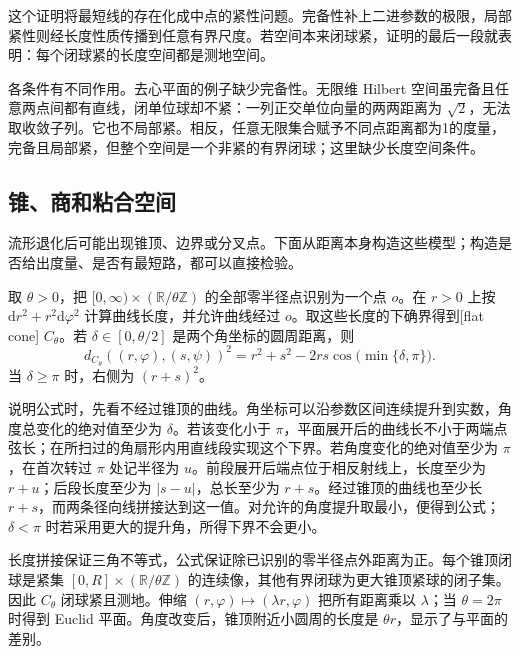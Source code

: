 这个证明将最短线的存在化成中点的紧性问题。完备性补上二进参数的极限，局部紧性则经长度性质传播到任意有界尺度。若空间本来闭球紧，证明的最后一段就表明：每个闭球紧的长度空间都是测地空间。

\ProseParagraphBreak

各条件有不同作用。去心平面的例子缺少完备性。无限维 Hilbert 空间虽完备且任意两点间都有直线，闭单位球却不紧：一列正交单位向量的两两距离为 \(\sqrt2\)，无法取收敛子列。它也不局部紧。相反，任意无限集合赋予不同点距离都为1的度量，完备且局部紧，但整个空间是一个非紧的有界闭球；这里缺少长度空间条件。

\subsection{锥、商和粘合空间}
\label{g3:subsec:1001:03}
流形退化后可能出现锥顶、边界或分叉点。下面从距离本身构造这些模型；构造是否给出度量、是否有最短路，都可以直接检验。

\begin{example}\label{g3:exm:flat-metric-cone}
	取 \(\theta>0\)，把 \([0,\infty)\times(\mathbb R/\theta\mathbb Z)\) 的全部零半径点识别为一个点 \(o\)。在 \(r>0\) 上按
	\(\mathrm dr^2+r^2\mathrm d\varphi^2\)
	计算曲线长度，并允许曲线经过 \(o\)。取这些长度的下确界得到[flat cone] \(C_\theta\)。若 \(\delta\in[0,\theta/2]\) 是两个角坐标的圆周距离，则
	\begin{equation}\label{g3:eq:flat-cone-distance}
		d_{C_\theta}((r,\varphi),(s,\psi))^2
		=r^2+s^2-2rs\cos\bigl(\min\{\delta,\pi\}\bigr).
	\end{equation}
	当 \(\delta\ge\pi\) 时，右侧为 \((r+s)^2\)。

	说明公式时，先看不经过锥顶的曲线。角坐标可以沿参数区间连续提升到实数，角度总变化的绝对值至少为 \(\delta\)。若该变化小于 \(\pi\)，平面展开后的曲线长不小于两端点弦长；在所扫过的角扇形内用直线段实现这个下界。若角度变化的绝对值至少为 \(\pi\)，在首次转过 \(\pi\) 处记半径为 \(u\)。前段展开后端点位于相反射线上，长度至少为 \(r+u\)；后段长度至少为 \(|s-u|\)，总长至少为 \(r+s\)。经过锥顶的曲线也至少长 \(r+s\)，而两条径向线拼接达到这一值。对允许的角度提升取最小，便得到公式；\(\delta<\pi\) 时若采用更大的提升角，所得下界不会更小。

	长度拼接保证三角不等式，公式保证除已识别的零半径点外距离为正。每个锥顶闭球是紧集 \([0,R]\times(\mathbb R/\theta\mathbb Z)\) 的连续像，其他有界闭球为更大锥顶紧球的闭子集。因此 \(C_\theta\) 闭球紧且测地。伸缩 \((r,\varphi)\mapsto(\lambda r,\varphi)\) 把所有距离乘以 \(\lambda\)；当 \(\theta=2\pi\) 时得到 Euclid 平面。角度改变后，锥顶附近小圆周的长度是 \(\theta r\)，显示了与平面的差别。
\end{example}

